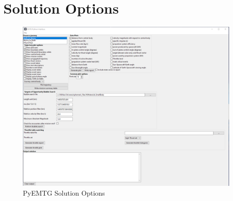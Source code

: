 \section{Solution Options}
\label{sec:pyemtg_solution_options}

    \begin{figure}[H]
        \centering
        \includegraphics[width=0.95\linewidth]{../../shared_latex_inputs/images/pyemtg_solution_options.png}
        \caption{PyEMTG Solution Options}
    \end{figure}